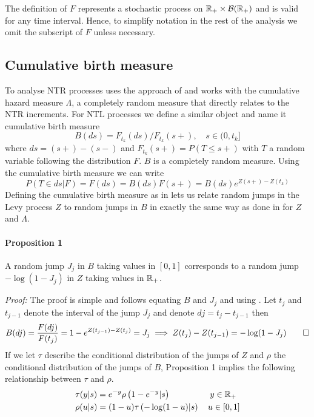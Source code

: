 The definition of $F$ represents a stochastic process on $\mathbb{R}_{+} \times \mathcal{B}(\mathbb{R}_{+})$ and is valid for any time interval. Hence, to simplify notation in the rest of the analysis we omit the subscript of $F$ unless necessary.

\subsection{Cumulative birth measure}\label{CBM}
To analyse NTR processes \cite{james2006poisson} uses the approach of \cite{hjort1990nonparametric} and works with the cumulative hazard measure $\Lambda$, a completely random measure that directly relates to the NTR increments. For NTL processes we define a similar object and name it cumulative birth measure 
\begin{equation}\label{birth_measure}
B(ds) = F_{t_k}(ds)/F_{t_k}(s+), \quad s \in (0, t_k]
\end{equation}
where $ds = (s+) - (s-)$ and $F_{t_k}(s+) = P(T \leq s+)$ with $T$ a random variable following the distribution $F$. $B$ is a completely random measure. Using the cumulative birth measure we can write
\begin{equation*}
P(T \in ds | F) = F(ds) = B(ds)F(s+) = B(ds)e^{Z(s+) - Z(t_k)}
\end{equation*}
Defining the cumulative birth measure as in  lets us relate random jumps in the Levy process $Z$ to random jumps in $B$ in exactly the same way as done in \cite{james2006poisson} for $Z$ and $\Lambda$. 

\paragraph{Proposition 1} A random jump $J_j$ in $B$ taking values in $[0,1]$ corresponds to a random jump $-\log(1 - J_j)$ in $Z$ taking values in $\mathbb{R}_+$.

\textit{Proof:} The proof is simple and follows equating $B$ and $J_j$ and using . Let $t_j$ and $t_{j-1}$ denote the interval of the jump $J_j$ and denote $dj = t_j - t_{j-1}$ then
\begin{equation*}
\begin{split}
B(dj) = \frac{F(dj)}{F(t_j)} = 1 - e^{Z(t_{j-1}) -Z(t_j)} = J_j \implies Z(t_j) - Z(t_{j-1}) = -\log(1- J_j) \qed
\end{split}
\end{equation*}
If we let $\tau$ describe the conditional distribution of the jumps of $Z$ and $\rho$ the conditional distribution of the jumps of $B$, Proposition 1 implies the following relationship between $\tau$ and $\rho$.
\begin{equation*}
\begin{split}
&\tau(y|s) = e^{-y}\rho\left(1- e^{-y} | s\right) \ \ \qquad\qquad y \in \mathbb{R}_{+} \\ & \rho(u|s) = (1- u)\tau\left(-\log(1-u) |s\right) \quad u \in [0, 1]
\end{split}
\end{equation*}



